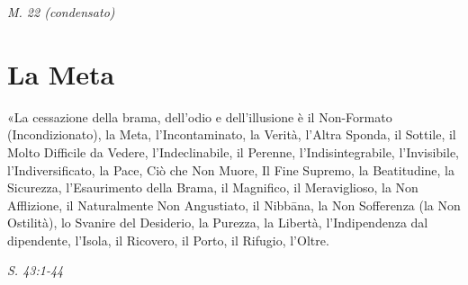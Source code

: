 \emph{M. 22 (condensato)}


\hypertarget{x-la-meta}{\section*{La Meta}}
«La cessazione della brama, dell’odio e dell’illusione è il Non-Formato
(Incondizionato), la Meta, l’Incontaminato, la Verità, l’Altra Sponda,
il Sottile, il Molto Difficile da Vedere, l’Indeclinabile, il Perenne,
l’Indisintegrabile, l’Invisibile, l’Indiversificato, la Pace, Ciò che
Non Muore, Il Fine Supremo, la Beatitudine, la Sicurezza, l’Esaurimento
della Brama, il Magnifico, il Meraviglioso, la Non Afflizione, il
Naturalmente Non Angustiato, il Nibbāna, la Non Sofferenza (la Non
Ostilità), lo Svanire del Desiderio, la Purezza, la Libertà,
l’Indipendenza dal dipendente, l’Isola, il Ricovero, il Porto, il
Rifugio, l’Oltre.


\emph{S. 43:1-44}


